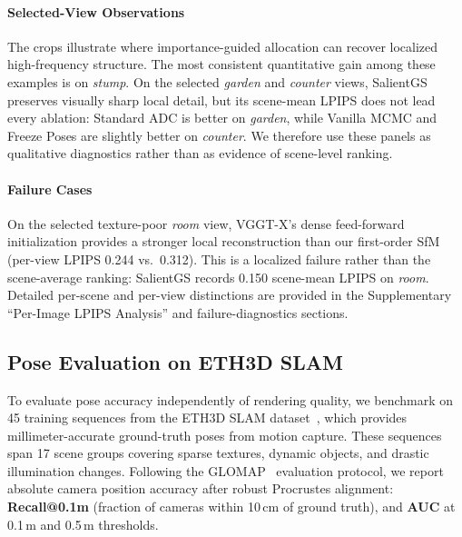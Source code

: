 \documentclass[sigconf]{acmart}
\begin{document}
\paragraph{Selected-View Observations}
The crops illustrate where importance-guided allocation can recover localized high-frequency structure. The most consistent quantitative gain among these examples is on \textit{stump}. On the selected \textit{garden} and \textit{counter} views, SalientGS preserves visually sharp local detail, but its scene-mean LPIPS does not lead every ablation: Standard ADC is better on \textit{garden}, while Vanilla MCMC and Freeze Poses are slightly better on \textit{counter}. We therefore use these panels as qualitative diagnostics rather than as evidence of scene-level ranking.

\paragraph{Failure Cases}
On the selected texture-poor \textit{room} view, VGGT-X's dense feed-forward initialization provides a stronger local reconstruction than our first-order SfM (per-view LPIPS 0.244 vs.\ 0.312). This is a localized failure rather than the scene-average ranking: SalientGS records 0.150 scene-mean LPIPS on \textit{room}. Detailed per-scene and per-view distinctions are provided in the Supplementary ``Per-Image LPIPS Analysis'' and failure-diagnostics sections.


\subsection{Pose Evaluation on ETH3D SLAM}
\label{sec:pose_eval}

To evaluate pose accuracy independently of rendering quality, we benchmark on 45 training sequences from the ETH3D SLAM dataset~\cite{Schops_2019_CVPR}, which provides millimeter-accurate ground-truth poses from motion capture. These sequences span 17 scene groups covering sparse textures, dynamic objects, and drastic illumination changes.
Following the GLOMAP~\cite{pan2024glomap} evaluation protocol, we report absolute camera position accuracy after robust Procrustes alignment: \textbf{Recall@0.1m} (fraction of cameras within 10\,cm of ground truth), and \textbf{AUC} at 0.1\,m and 0.5\,m thresholds.
\end{document}
